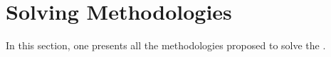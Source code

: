 \section{Solving Methodologies}

In this section, one presents all the methodologies proposed to solve the \MUPKP.
